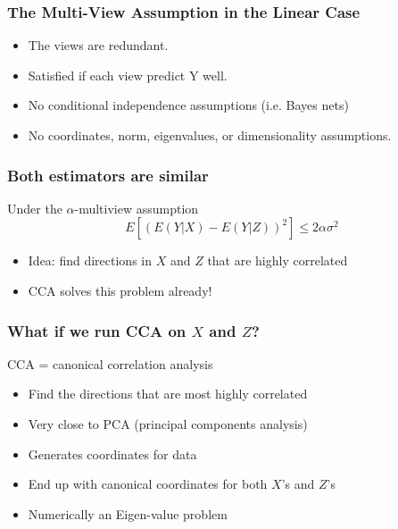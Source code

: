 \documentclass{beamer}
\begin{document}

\begin{frame}
  \frametitle{The Multi-View Assumption in the Linear Case}

  \begin{itemize}
  \item The views are redundant.
  \item Satisfied if each view predict Y well.
  \item No conditional independence assumptions (i.e. Bayes nets)
  \item No coordinates, norm, eigenvalues, or dimensionality assumptions.
  \end{itemize}

\end{frame}


\begin{frame}
\frametitle{Both estimators are similar}
\begin{Lemma} Under the $\alpha$-multiview assumption
\begin{displaymath}
E[ (E(Y|X) - E(Y|Z))^2 ] \le 2 \alpha \sigma^2
\end{displaymath}
\end{Lemma}
\begin{itemize}
\item Idea: find directions in $X$ and $Z$ that are highly correlated 
\item CCA solves this problem already!
\end{itemize}
\end{frame}


\begin{frame}

\frametitle{What if we run CCA on $X$ and $Z$?}

CCA = canonical correlation analysis
\begin{itemize}
\item Find the directions that are most highly correlated
\item Very close to PCA (principal components analysis)
\item Generates coordinates for data
\item End up with canonical coordinates for both $X$'s and $Z$'s
\item Numerically an Eigen-value problem
\end{itemize}

\end{frame}
\end{document}
